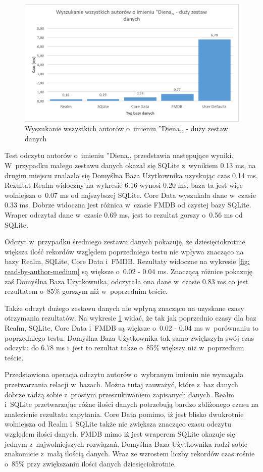 \begin{figure}[H]
\centering
	\includegraphics[width=15cm]{img/read_data/read_by_authors/read_by_author_big_test.png}
	\caption{Wyszukanie wszystkich autorów o~imieniu ''Diena,, - duży zestaw danych}
	\label{fig: read-by-author-big}
\end{figure}

Test odczytu autorów o~imieniu ''Diena,, przedstawia następujące wyniki. W~przypadku małego zestawu danych okazał się SQLite z~wynikiem 0.13 ms, na drugim miejscu znalazła się Domyślna Baza Użytkownika uzyskując czas 0.14 ms. Rezultat Realm widoczny na wykresie 6.16 wynosi 0.20 ms, baza ta jest więc wolniejsza o~0.07 ms od najszybszej SQLite. Core Data wyszukała dane w~czasie 0.33 ms. Dobrze widoczna jest różnica w~czasie FMDB od czystej bazy SQLite. Wraper odczytał dane w~czasie 0.69 ms, jest to rezultat gorszy o~0.56 ms od SQLite. 

Odczyt w~przypadku średniego zestawu danych pokazuję, że dziesięciokrotnie większa ilość rekordów względem poprzedniego testu  nie wpływa znacząco na bazy Realm, SQLite, Core Data i~FMDB. Rezultaty widoczne na wykresie \ref{fig: read-by-author-medium} są większe o~0.02 - 0.04 ms. Znaczącą różnice pokazuję zaś Domyślna Baza Użytkownika, odczytała ona dane w~czasie 0.83 ms co jest rezultatem o~85\% gorszym niż w~poprzednim teście. 

Także odczyt dużego zestawu danych nie wpłyną znacząco na uzyskane czasy otrzymania rezultatów. Na wykresie \ref{fig: read-by-author-big} widać, że tak jak poprzednio czasy dla baz Realm, SQLite, Core Data i~FMDB są większe o~0.02 - 0.04 ms w~porównaniu to poprzedniego testu. Domyślna Baza Użytkownika tak samo zwiększyła swój czas odczytu do 6.78 ms i~jest to rezultat także o~85\% większy niż w~poprzednim teście. 

Przedstawiona operacja odczytu autorów o~wybranym imieniu nie wymagała przetwarzania relacji w~bazach. Można tutaj zauważyć, które z~baz danych dobrze radzą sobie z~prostym przeszukiwaniem zapisanych danych. Realm i~SQLite przetwarzając różne ilości danych potrzebują bardzo zbliżonego czasu na znalezienie rezultatu zapytania. Core Data pomimo, iż jest blisko dwukrotnie wolniejsza od Realm i~SQLite także nie zwiększa znacząco czasu odczytu względem ilości danych. FMDB mimo iż jest wraperem SQLite okazuje się jednym z~najwolniejszych rozwiązań. Domyślna Baza Użytkownika radzi sobie znakomicie z~małą ilością danych. Wraz ze wzrostem liczby rekordów czas rośnie o~85\% przy zwiększaniu ilości danych dziesięciokrotnie.

